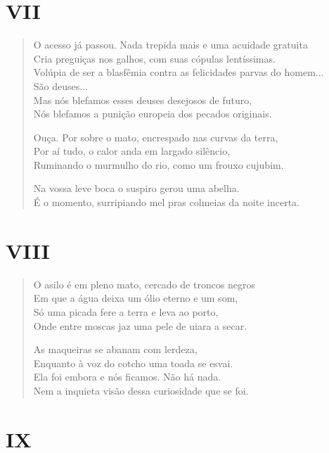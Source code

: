 \medskip
\section{VII}

\begin{verse}
O acesso já passou. Nada trepida mais e uma acuidade gratuita\\
Cria preguiças nos galhos, com suas cópulas lentíssimas.\\
Volúpia de ser a blasfêmia contra as felicidades parvas do homem...\\
São deuses...\\
Mas nós blefamos esses deuses desejosos de futuro,\\
Nós blefamos a punição europeia dos pecados originais.

Ouça. Por sobre o mato, encrespado nas curvas da terra,\\
Por aí tudo, o calor anda em largado silêncio,\\
Ruminando o murmulho do rio, como um frouxo cujubim.

Na vossa leve boca o suspiro gerou uma abelha.\\
É o momento, surripiando mel pras colmeias da noite incerta.
\end{verse}

\medskip
\section{VIII}

\begin{verse}
O asilo é em pleno mato, cercado de troncos negros\\
Em que a água deixa um ólio eterno e um som,\\
Só uma picada fere a terra e leva ao porto,\\
Onde entre moscas jaz uma pele de uiara a secar.

As maqueiras se abanam com lerdeza,\\
Enquanto à voz do cotcho uma toada se esvai.\\
Ela foi embora e nós ficamos. Não há nada.\\
Nem a inquieta visão dessa curiosidade que se foi.
\end{verse}

\medskip
\section{IX}

